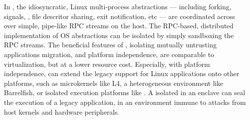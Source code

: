 In \graphene{},
the idiosyncratic, Linux multi-process abstractions
--- including forking, signals, \sysvipc{}, file descritor sharing, exit notification, etc
--- are coordinated across \picoprocs{}
over simple, pipe-like RPC streams on the host.
The RPC-based, distributed implementation of OS abstractions
can be isolated by simply sandboxing the RPC streams.
The beneficial features of \graphene{}, %
isolating mutually untrusting applications
migration,
and platform independence,
are comparable to virtualization,
but at a lower resource cost.
Especially, with platform independence, \graphene{}
can extend
the legacy support for Linux applications
onto other platforms,
such as microkernels like L4, a heterogeneous environment like Barrelfish,
or isolated execution platforms like .
A \graphene{} \picoproc{} isolated in an enclave
can seal the execution of a legacy application,
in an environment immune to attacks from host kernels
and hardware peripherals.




